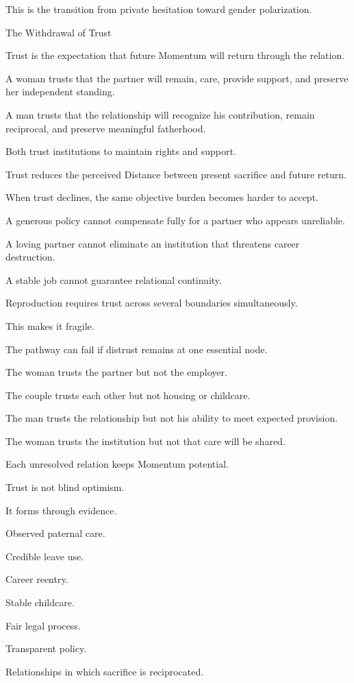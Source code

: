 This is the transition from private hesitation toward gender polarization.

The Withdrawal of Trust

Trust is the expectation that future Momentum will return through the relation.

A woman trusts that the partner will remain, care, provide support, and preserve her independent standing.

A man trusts that the relationship will recognize his contribution, remain reciprocal, and preserve meaningful fatherhood.

Both trust institutions to maintain rights and support.

Trust reduces the perceived Distance between present sacrifice and future return.

When trust declines, the same objective burden becomes harder to accept.

A generous policy cannot compensate fully for a partner who appears unreliable.

A loving partner cannot eliminate an institution that threatens career destruction.

A stable job cannot guarantee relational continuity.

Reproduction requires trust across several boundaries simultaneously.

This makes it fragile.

The pathway can fail if distrust remains at one essential node.

The woman trusts the partner but not the employer.

The couple trusts each other but not housing or childcare.

The man trusts the relationship but not his ability to meet expected provision.

The woman trusts the institution but not that care will be shared.

Each unresolved relation keeps Momentum potential.

Trust is not blind optimism.

It forms through evidence.

Observed paternal care.

Credible leave use.

Career reentry.

Stable childcare.

Fair legal process.

Transparent policy.

Relationships in which sacrifice is reciprocated.

